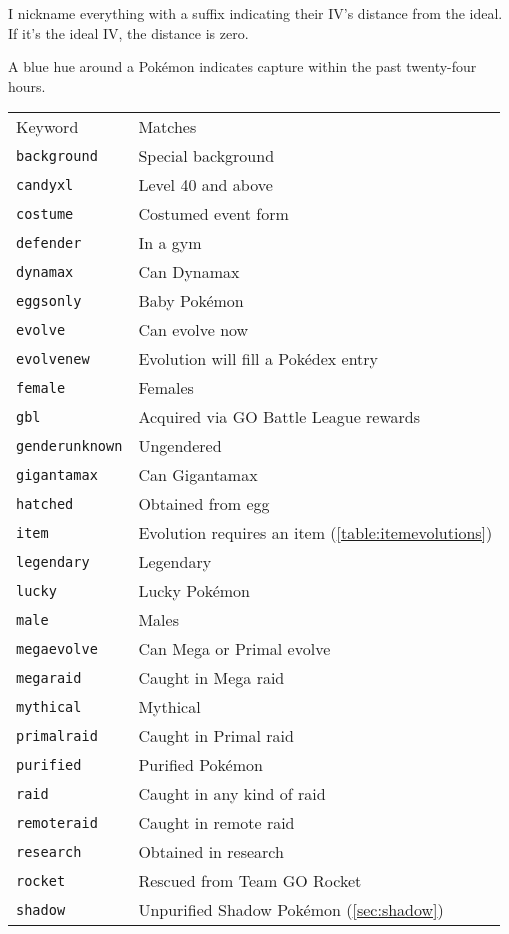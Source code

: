 I nickname everything with a suffix indicating their IV's distance from the ideal.
If it's the ideal IV, the distance is zero.

A blue hue around a Pokémon indicates capture within the past twenty-four hours.
\begin{table}
\centering\small
\begin{tabular}{ll}
Keyword & Matches \\
\Midrule
\texttt{background} & Special background \\
\texttt{candyxl} & Level 40 and above \\
\texttt{costume} & Costumed event form \\
\texttt{defender} & In a gym \\
\texttt{dynamax} & Can Dynamax\\
\texttt{eggsonly} & Baby Pokémon \\
\texttt{evolve} & Can evolve now\\
\texttt{evolvenew} & Evolution will fill a Pokédex entry\\
\texttt{female} & Females \\
\texttt{gbl} & Acquired via GO Battle League rewards\\
\texttt{genderunknown} & Ungendered \\
\texttt{gigantamax} & Can Gigantamax\\
\texttt{hatched} & Obtained from egg \\
\texttt{item} & Evolution requires an item (\autoref{table:itemevolutions})\\
\texttt{legendary} & Legendary \\
\texttt{lucky} & Lucky Pokémon \\
\texttt{male} & Males\\
\texttt{megaevolve} & Can Mega or Primal evolve\\
\texttt{megaraid} & Caught in Mega raid\\
\texttt{mythical} & Mythical\\
\texttt{primalraid} & Caught in Primal raid\\
\texttt{purified} & Purified Pokémon\\
\texttt{raid} & Caught in any kind of raid\\
\texttt{remoteraid} & Caught in remote raid\\
\texttt{research} & Obtained in research\\
\texttt{rocket} & Rescued from Team GO Rocket\\
\texttt{shadow} & Unpurified Shadow Pokémon (\autoref{sec:shadow})\\

\end{tabular}
\end{table}
